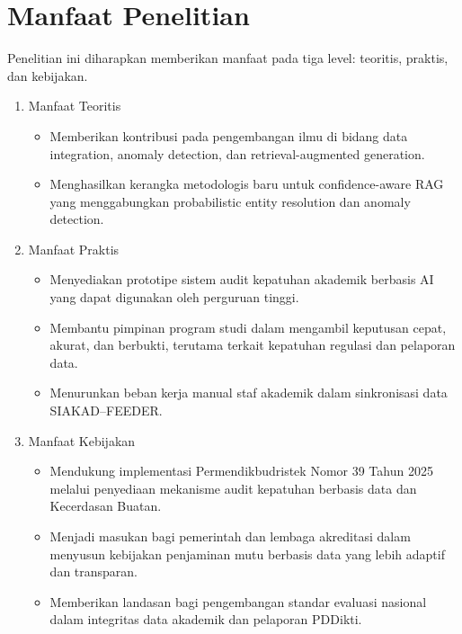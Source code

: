\documentclass[12pt,a4paper,oneside]{report}
\begin{document}
        \section{Manfaat Penelitian}
            Penelitian ini diharapkan memberikan manfaat pada tiga level: teoritis, praktis, dan kebijakan.
            \begin{enumerate}
                \item Manfaat Teoritis
                    \begin{itemize}
                        \item Memberikan kontribusi pada pengembangan ilmu di bidang data integration, anomaly detection, dan retrieval-augmented generation.
                        \item Menghasilkan kerangka metodologis baru untuk confidence-aware RAG yang menggabungkan probabilistic entity resolution dan anomaly detection.
                    \end{itemize}
                \item Manfaat Praktis
                    \begin{itemize}
                        \item Menyediakan prototipe sistem audit kepatuhan akademik berbasis AI yang dapat digunakan oleh perguruan tinggi.
                        \item Membantu pimpinan program studi dalam mengambil keputusan cepat, akurat, dan berbukti, terutama terkait kepatuhan regulasi dan pelaporan data.
                        \item Menurunkan beban kerja manual staf akademik dalam sinkronisasi data SIAKAD–FEEDER.
                    \end{itemize}
                \item Manfaat Kebijakan
                    \begin{itemize}
                        \item Mendukung implementasi Permendikbudristek Nomor 39 Tahun 2025 melalui penyediaan mekanisme audit kepatuhan berbasis data dan Kecerdasan Buatan.
                        \item Menjadi masukan bagi pemerintah dan lembaga akreditasi dalam menyusun kebijakan penjaminan mutu berbasis data yang lebih adaptif dan transparan.
                        \item Memberikan landasan bagi pengembangan standar evaluasi nasional dalam integritas data akademik dan pelaporan PDDikti.
                    \end{itemize}
            \end{enumerate}
    \onehalfspacing
    
\end{document}
